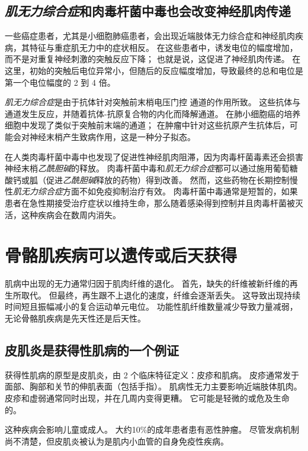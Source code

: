 \subsection{\textit{肌无力综合症}和肉毒杆菌中毒也会改变神经肌肉传递}

一些癌症患者，尤其是小细胞肺癌患者，会出现近端肢体无力综合症和神经肌肉疾病，其特征与重症肌无力中的症状相反。
在这些患者中，诱发电位的幅度增加，而不是对重复神经刺激的突触反应下降；
也就是说，这促进了神经肌肉传递。
在这里，初始的突触后电位异常小，但随后的反应幅度增加，导致最终的总和电位是第一个电位幅度的 2 到 4 倍。


\textit{肌无力综合症}是由于抗体针对突触前末梢电压门控  通道的作用所致。
这些抗体与通道发生反应，并随着抗体-抗原复合物的内化而降解通道。
在肺小细胞癌的培养细胞中发现了类似于突触前末端的通道；
在肿瘤中针对这些抗原产生抗体后，可能会对神经末梢产生致病作用，这是一种分子拟态。


在人类肉毒杆菌中毒中也发现了促进性神经肌肉阻滞，因为肉毒杆菌毒素还会损害神经末梢\textit{乙酰胆碱}的释放。
肉毒杆菌中毒和\textit{肌无力综合症}都可以通过施用葡萄糖酸钙或胍（促进\textit{乙酰胆碱}释放的药物）得到改善。
然而，这些药物在长期控制慢性\textit{肌无力综合症}方面不如免疫抑制治疗有效。
肉毒杆菌中毒通常是短暂的，如果患者在急性期接受治疗症状以维持生命，那么随着感染得到控制并且肉毒杆菌被灭活，这种疾病会在数周内消失。



\section{骨骼肌疾病可以遗传或后天获得}

肌病中出现的无力通常归因于肌肉纤维的退化。
首先，缺失的纤维被新纤维的再生所取代。
但最终，再生跟不上退化的速度，纤维会逐渐丢失。
这导致出现持续时间短且振幅减小的复合运动单元电位。
功能性肌纤维数量减少导致力量减弱，无论骨骼肌疾病是先天性还是后天性。



\subsection{皮肌炎是获得性肌病的一个例证}

获得性肌病的原型是皮肌炎，由 2 个临床特征定义：皮疹和肌病。
皮疹通常发于面部、胸部和关节的伸肌表面（包括手指）。
肌病性无力主要影响近端肢体肌肉。
皮疹和虚弱通常同时出现，并在几周内变得更糟。
它可能是轻微的或危及生命的。


这种疾病会影响儿童或成人。
大约10\%的成年患者患有恶性肿瘤。
尽管发病机制尚不清楚，但皮肌炎被认为是肌内小血管的自身免疫性疾病。




